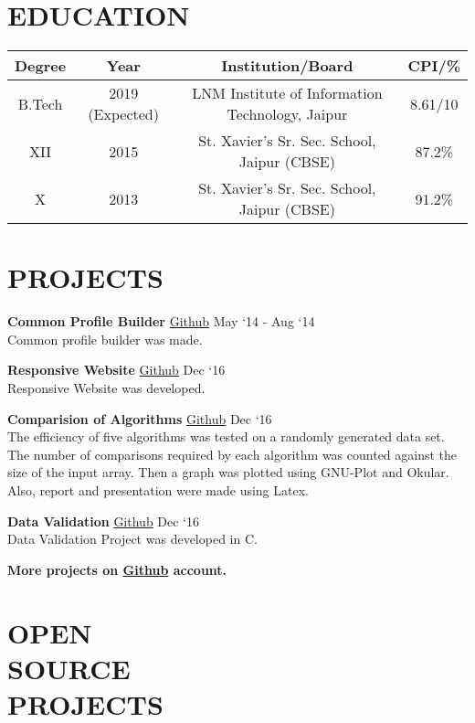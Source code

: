 \documentclass[margin]{res}
\begin{document}
\begin{resume}

\section{EDUCATION}

\begin{tabular}{|c|c|c|c|}

\hline
\textbf{Degree} & \textbf{Year} & {Institution/Board} & {CPI/\%} \\
\hline
B.Tech & 2019 (Expected) & LNM Institute of Information Technology, Jaipur & 8.61/10 \\
\hline
XII & 2015 & St. Xavier’s Sr. Sec. School, Jaipur (CBSE) & 87.2\% \\
\hline
X & 2013 & St. Xavier’s Sr. Sec. School, Jaipur (CBSE) & 91.2\% \\
\hline
\end{tabular}

\section{PROJECTS}

  {\textbf{Common Profile Builder}} \href{https://github.com/karanagarwal17/web_scrapper_nodejs}{Github} \hfill May `14 - Aug `14\\
  Common profile builder was made.

  {\textbf{Responsive Website}} \href{https://github.com/karanagarwal17/responsive-web-project}{Github} \hfill Dec `16\\
  Responsive Website was developed.

  {\textbf{Comparision of Algorithms}} \href{https://github.com/karanagarwal17/comparision-of-algorithms}{Github} \hfill Dec `16\\
  The efficiency of five algorithms was tested on a randomly generated data set. The number of comparisons required by each algorithm was counted against the size of the input array. Then a graph was plotted using GNU-Plot and Okular. Also, report and presentation were made using Latex.

  {\textbf{Data Validation}} \href{https://github.com/karanagarwal17/Data-Validation}{Github} \hfill Dec `16\\
  Data Validation Project was developed in C.

  \textbf{More projects on \href{https://github.com/karanagarwal17}{Github} account.}

  \section{OPEN \\SOURCE \\ PROJECTS}


\end{resume}
\end{document}
